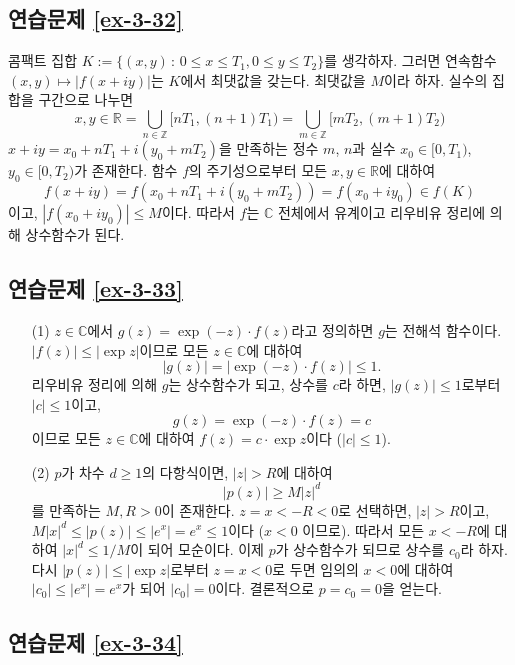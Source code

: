 \subsection*{연습문제 \ref{ex-3-32}}

콤팩트 집합 $K:=\{ (x,y) \,:\, 0\le x\le T_1, 0\le y \le T_2\}$를 생각하자.
그러면 연속함수 $(x,y)\mapsto |f(x+iy)|$는 $K$에서 최댓값을 갖는다. 
최댓값을  $M$이라 하자. 
실수의 집합을 구간으로 나누면
\[
x,y\in\mathbb R = \bigcup_{n\in\mathbb Z} [ nT_1, (n+1)T_1)
= \bigcup_{m\in\mathbb Z} [ mT_2, (m+1)T_2)
\]
$x+iy = x_0 +nT_1 + i(y_0+mT_2)$을 만족하는 정수 $m$, $n$과
실수 $x_0\in [0,T_1)$, $y_0\in [0,T_2)$가 존재한다.
함수 $f$의 주기성으로부터 모든 $x,y\in\mathbb R$에 대하여
\[
f(x+iy) = f(x_0+nT_1 + i(y_0+mT_2)) = f(x_0+iy_0) \in f(K)
\]
이고, $|f(x_0+iy_0)| \le M$이다.
따라서 $f$는 $\mathbb C$ 전체에서 유계이고
리우비유 정리에 의해 상수함수가 된다.

\subsection*{연습문제 \ref{ex-3-33}}

\begin{itemize}
\item[(1)] $z\in\mathbb C$에서 $g(z)=\exp(-z)\cdot f(z)$라고 정의하면
$g$는 전해석 함수이다. $|f(z)| \le|\exp z|$이므로 모든 $z\in\mathbb C$에 대하여
\[
|g(z)| =| \exp(-z)\cdot f(z)| \le 1.
\]
리우비유 정리에 의해 $g$는 상수함수가 되고, 상수를 $c$라 하면,
$|g(z)|\le1$로부터 $|c|\le1$이고,
\[
g(z) = \exp(-z)\cdot f(z) = c
\]
이므로 모든 $z\in\mathbb C$에 대하여 $f(z)  = c\cdot \exp z$이다 ($|c|\le1$).

\item[(2)] $p$가 차수 $d\ge1$의 다항식이면,
$|z|>R$에 대하여
\[
|p(z)| \ge M|z|^d
\]
를 만족하는 $M, R>0$이 존재한다.
$z=x <  -R <0$로 선택하면,
$|z|>R$이고, $M|x|^d \le |p(z)| \le |e^x| = e^x \le 1$이다 ($x<0$ 이므로).
따라서 모든 $x<-R$에 대하여 $|x|^d \le 1/M$이 되어 모순이다.
이제 $p$가 상수함수가 되므로 상수를 $c_0$라 하자.
다시 $|p(z)| \le |\exp z|$로부터 $z=x<0$로 두면
임의의 $x<0$에 대하여
$|c_0| \le |e^x| = e^x$가 되어 $|c_0|=0$이다.
결론적으로 $p=c_0=0$을 얻는다.
\end{itemize}

\subsection*{연습문제 \ref{ex-3-34}}

